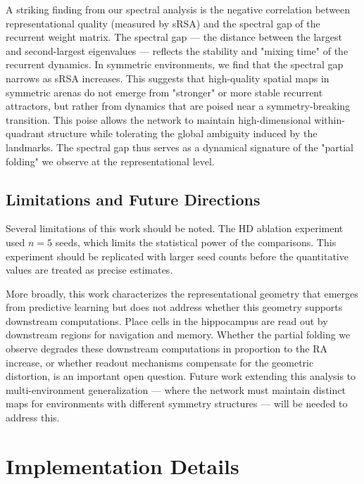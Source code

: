 \documentclass[11pt, a4paper]{article}
\begin{document}
A striking finding from our spectral analysis is the negative correlation between representational quality (measured by sRSA) and the spectral gap of the recurrent weight matrix. The spectral gap --- the distance between the largest and second-largest eigenvalues --- reflects the stability and "mixing time" of the recurrent dynamics. In symmetric environments, we find that the spectral gap narrows as sRSA increases. This suggests that high-quality spatial maps in symmetric arenas do not emerge from "stronger" or more stable recurrent attractors, but rather from dynamics that are poised near a symmetry-breaking transition. This poise allows the network to maintain high-dimensional within-quadrant structure while tolerating the global ambiguity induced by the landmarks. The spectral gap thus serves as a dynamical signature of the "partial folding" we observe at the representational level.

\subsection{Limitations and Future Directions}

Several limitations of this work should be noted. The HD ablation
experiment used $n=5$ seeds, which
limits the statistical power of the comparisons. This experiment should
be replicated with larger seed counts before the quantitative values are
treated as precise estimates.

More broadly, this work characterizes the representational geometry that
emerges from predictive learning but does not address whether this
geometry supports downstream computations. Place cells in the hippocampus
are read out by downstream regions for navigation and memory. Whether the
partial folding we observe degrades these downstream computations in
proportion to the RA increase, or whether readout mechanisms compensate
for the geometric distortion, is an important open question. Future work
extending this analysis to multi-environment generalization --- where
the network must maintain distinct maps for environments with different
symmetry structures --- will be needed to address this.








\appendix
\section{Implementation Details}
\label{app:implementation}
\end{document}
